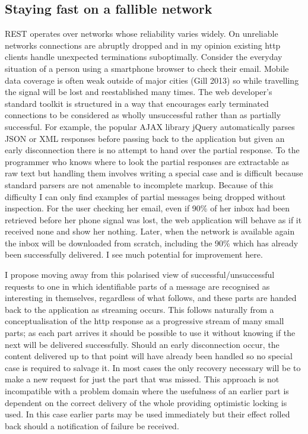 \documentclass[12pt, ]{article}
\begin{document}
\subsection{Staying fast on a fallible
network}\label{staying-fast-on-a-fallible-network}

REST operates over networks whose reliability varies widely. On
unreliable networks connections are abruptly dropped and in my opinion
existing http clients handle unexpected terminations suboptimally.
Consider the everyday situation of a person using a smartphone browser
to check their email. Mobile data coverage is often weak outside of
major cities (Gill 2013) so while travelling the signal will be lost and
reestablished many times. The web developer's standard toolkit is
structured in a way that encourages early terminated connections to be
considered as wholly unsuccessful rather than as partially successful.
For example, the popular AJAX library jQuery automatically parses JSON
or XML responses before passing back to the application but given an
early disconnection there is no attempt to hand over the partial
response. To the programmer who knows where to look the partial
responses are extractable as raw text but handling them involves writing
a special case and is difficult because standard parsers are not
amenable to incomplete markup. Because of this difficulty I can only
find examples of partial messages being dropped without inspection. For
the user checking her email, even if 90\% of her inbox had been
retrieved before her phone signal was lost, the web application will
behave as if it received none and show her nothing. Later, when the
network is available again the inbox will be downloaded from scratch,
including the 90\% which has already been successfully delivered. I see
much potential for improvement here.

I propose moving away from this polarised view of
successful/unsuccessful requests to one in which identifiable parts of a
message are recognised as interesting in themselves, regardless of what
follows, and these parts are handed back to the application as streaming
occurs. This follows naturally from a conceptualisation of the http
response as a progressive stream of many small parts; as each part
arrives it should be possible to use it without knowing if the next will
be delivered successfully. Should an early disconnection occur, the
content delivered up to that point will have already been handled so no
special case is required to salvage it. In most cases the only recovery
necessary will be to make a new request for just the part that was
missed. This approach is not incompatible with a problem domain where
the usefulness of an earlier part is dependent on the correct delivery
of the whole providing optimistic locking is used. In this case earlier
parts may be used immediately but their effect rolled back should a
notification of failure be received.
\end{document}
